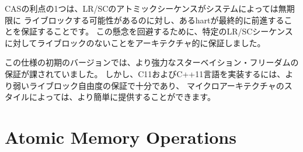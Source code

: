 \begin{commentary}
\begin{comment}
One advantage of CAS is that it guarantees that some hart eventually
makes progress, whereas an LR/SC atomic sequence could livelock
indefinitely on some systems.  To avoid this concern, we added an
architectural guarantee of livelock freedom for certain LR/SC sequences.
\end{comment}

CASの利点の1つは、LR/SCのアトミックシーケンスがシステムによっては無期限に
ライブロックする可能性があるのに対し、あるhartが最終的に前進することを保証することです。
この懸念を回避するために、特定のLR/SCシーケンスに対してライブロックのないことをアーキテクチャ的に保証しました。

\begin{comment}
Earlier versions of this specification imposed a stronger starvation-freedom
guarantee.  However, the weaker livelock-freedom guarantee is sufficient to
implement the C11 and C++11 languages, and is substantially easier to provide
in some microarchitectural styles.
\end{comment}
この仕様の初期のバージョンでは、より強力なスターベイション・フリーダムの保証が課されていました。
しかし、C11およびC++11言語を実装するには、より弱いライブロック自由度の保証で十分であり、
マイクロアーキテクチャのスタイルによっては、より簡単に提供することができます。
\end{commentary}

\section{Atomic Memory Operations}
\label{sec:amo}


